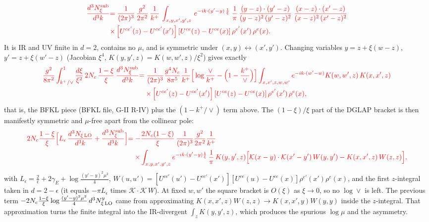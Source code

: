 \documentclass[9pt]{article}
\numberwithin{equation}{section}
\begin{document}
\begin{align}
{\color{red}\frac{d^{3}N^{\rm sub}_{\xi}}{d^{3}k}} & {\color{red}= \frac{1}{(2\pi)^{3}}\, \frac{g^{2}}{2\pi^{2}}\, \frac{1}{k^{+}}\,\int_{x,y,x',y',z}\, e^{-ik\cdot (y'-y)\,\frac{1}{\xi}}\;\frac{1}{\pi}\,\frac{(y-z)\cdot (y'-z)}{(y-z)^{2}\,(y'-z)^{2}}\;\frac{(x-z)\cdot (x'-z)}{(x-z)^{2}\,(x'-z)^{2}}}\notag\\
&{\color{red}\times\left[U^{ce'}(z) - U^{ce'}(x')\right]\left[U^{ce}(z) - U^{ce}(x)\right]\rho^{e'}(x')\,\rho^{e}(x).}
\end{align}
{\color{red}It is IR and UV finite in $d=2$, contains no $\mu$, and is symmetric under $(x,y)\leftrightarrow(x',y')$. Changing variables $y=z+\xi(w-z)$, $y'=z+\xi(w'-z)$ (Jacobian $\xi^4$, $K(y,y',z)=K(w,w',z)/\xi^2$) gives exactly}
\begin{align}
{\color{red}\frac{g^{2}}{8\pi^{2}}\int_{k^+/\vee}^{1}\frac{d\xi}{\xi^{2}}\,2N_c\,\frac{1-\xi}{\xi}\,\frac{d^{3}N^{\rm sub}_{\xi}}{d^{3}k}} &{\color{red}=\frac{1}{(2\pi)^{3}}\frac{g^{4}N_{c}}{8\pi^{5}}\frac{1}{k^{+}}\Big[\log\frac{\vee}{k^{+}}-\Big(1-\frac{k^{+}}{\vee}\Big)\Big]\int_{x,x',z,w,w'}e^{-ik\cdot(w'-w)}K(w,w',z)\,K(x,x',z)}\notag\\
&{\color{red}\quad\times\left[U^{ce'}(z) - U^{ce'}(x')\right]\left[U^{ce}(z) - U^{ce}(x)\right]\rho^{e'}(x')\,\rho^{e}(x),}
\end{align}
{\color{red}that is, the BFKL piece (BFKL file, G-II R-IV) plus the $(1-k^+/\vee)$ term above. The $(1-\xi)/\xi$ part of the DGLAP bracket is then manifestly symmetric and $\mu$-free apart from the collinear pole:}
\begin{align}
{\color{red}2N_c\frac{1-\xi}{\xi}\Big[L_\epsilon\,\frac{d^{3}N_{\xi\,\rm LO}}{d^{3}k}+\frac{d^{3}N^{\rm sub}_{\xi}}{d^{3}k}\Big]}&{\color{red}=-\frac{2N_c(1-\xi)}{\xi}\,\frac{1}{(2\pi)^{3}}\frac{g^{2}}{2\pi^{2}}\frac{1}{k^{+}}}\notag\\&{\color{red}\quad\times\int_{x,y,x',y',z}e^{-ik\cdot(y'-y)\frac1\xi}\,\frac1\pi\,K(y,y',z)\Big[\mathcal K(x-y)\cdot\mathcal K(x'-y')\,W(y,y')-K(x,x',z)\,W(z,z)\Big],}
\end{align}
{\color{red}with $L_\epsilon=\frac{2}{\epsilon}+2\gamma_E+\log\frac{(y'-y)^2\mu^2}{4}$, $W(u,u')=[U^{ce'}(u')-U^{ce'}(x')][U^{ce}(u)-U^{ce}(x)]\rho^{e'}(x')\rho^{e}(x)$, and the first $z$-integral taken in $d=2-\epsilon$ (it equals $-\pi L_\epsilon$ times $\mathcal K\cdot\mathcal K\,W$). At fixed $w,w'$ the square bracket is $O(\xi)$ as $\xi\to0$, so no $\log\vee$ is left. The previous term $-2N_c\frac{1-\xi}{\xi}\log\frac{(y'-y)^2\mu^2}{4}\,d^3N^{y}_{\xi\,\rm LO}$ came from approximating $K(x,x',z)W(z,z)\to K(x,x',y)W(y,y)$ inside the $z$-integral. That approximation turns the finite integral into the IR-divergent $\int_zK(y,y',z)$, which produces the spurious $\log\mu$ and the asymmetry.}
\end{document}
